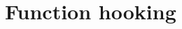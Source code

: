 \documentclass{report}
\begin{document}
\section{Function hooking}
\label{sec:detection:function-hooking}

\end{document}
